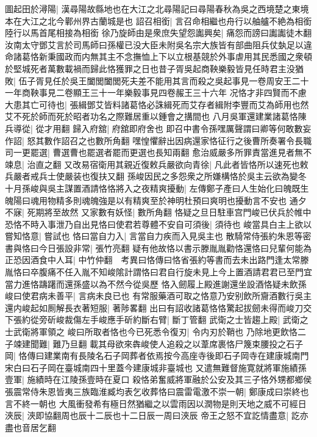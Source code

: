圖起田於潯陽|{
	漢尋陽故縣地也在大江之北尋陽記曰尋陽春秋為吳之西境楚之東境本在大江之北今鄿州界古蘭城是也}
詔召相銜|{
	言召命相繼也舟行以舳艫不絶為相銜陸行以馬首尾相接為相銜}
徐乃旋師由是衆庶失望怨讟興矣|{
	痛怨而謗曰讟讟徒木翻}
汝南太守鄧艾言於司馬師曰孫權已没大臣未附吳名宗大族皆有部曲阻兵仗埶足以違命諸葛恪新秉國政而内無其主不念撫恤上下以立根基競於外事虐用其民悉國之衆頓於堅城死者萬數載禍而歸此恪獲罪之日也昔子胥吳起商鞅樂毅皆見任時君主没猶敗|{
	伍子胥見任於吳王闔閭闔閭死夫差不能用其言而殺之吳起事見一卷周安王二十一年商鞅事見二卷顯王三十一年樂毅事見四卷赧王三十六年}
况恪才非四賢而不慮大患其亡可待也|{
	張緝鄧艾皆料諸葛恪必誅緝死而艾存者緝附李豐而艾為師用也然艾不死於師而死於昭者功名之際難居重以鍾會之搆間也}
八月吳軍還建業諸葛恪陳兵導從|{
	從才用翻}
歸入府舘|{
	府舘即府舍也}
即召中書令孫嘿厲聲謂曰卿等何敢數妄作詔|{
	怒其數作詔召之也數所角翻}
嘿惶懼辭出因病還家恪征行之後曹所奏署令長職司一更罷選|{
	曹選曹也罷選者罷而更選也長知兩翻}
愈治威嚴多所罪責當進見者無不竦息|{
	治直之翻}
又改易宿衛用其親近復敕兵嚴欲向青徐|{
	凡此者皆恪所以速死也敕兵嚴者戒兵士使嚴装也復扶又翻}
孫峻因民之多怨衆之所嫌構恪於吳主云欲為變冬十月孫峻與吳主謀置酒請恪恪將入之夜精爽擾動|{
	左傳鄭子產曰人生始化曰魄既生魄陽曰魂用物精多則魂魄強是以有精爽至於神明杜預曰爽明也擾動言不安也}
通夕不寐|{
	死期將至故然}
又家數有妖怪|{
	數所角翻}
恪疑之旦日駐車宫門峻已伏兵於帷中恐恪不時入事泄乃自出見恪曰使君若尊體不安自可須後|{
	須待也}
峻當具白主上欲以嘗知恪意|{
	嘗試也}
恪曰當自力入|{
	言當自力疾而入見吳主也}
散騎常侍張約朱恩等密書與恪曰今日張設非常|{
	張竹亮翻}
疑有他故恪以書示滕胤胤勸恪還恪曰兒輩何能為正恐因酒食中人耳|{
	中竹仲翻　考異曰恪傳曰恪省張約等書而去未出路門逢太常滕胤恪曰卒腹痛不任入胤不知峻隂計謂恪曰君自行旋未見上今上置酒請君君已至門宜當力進恪躊躇而還孫盛以為不然今從吳歷}
恪入劒履上殿進謝還坐設酒恪疑未飲孫峻曰使君病未善平|{
	言病未良已也}
有常服藥酒可取之恪意乃安别飲所齎酒數行吳主還内峻起如厠解長衣著短服|{
	著陟畧翻}
出曰有詔收諸葛恪恪驚起拔劒未得而峻刀交下張約從旁斫峻裁傷左手峻應手斫約斷右臂|{
	斷丁管翻}
武衛之士皆趨上殿|{
	武衛之士武衛將軍領之}
峻曰所取者恪也今已死悉令復刃|{
	令内刃於鞘也}
乃除地更飲恪二子竦建聞難|{
	難乃旦翻}
載其母欲來犇峻使人追殺之以葦席裹恪尸篾束腰投之石子岡|{
	恪傳曰建業南有長陵名石子岡葬者依焉按今高座寺後即石子岡寺在建康城南門宋白曰石子岡在臺城南四十里蓋今建康城非臺城也}
又遣無難督施寛就將軍施績孫壹軍|{
	施績時在江陵孫壹時在夏口}
殺恪弟奮威將軍融於公安及其三子恪外甥都鄉侯張震常侍朱恩皆夷三族臨淮臧均表乞收葬恪曰震雷電激不崇一朝|{
	鄭康成曰崇終也言不終一朝也}
大風衝發希有極日然猶繼之以雲雨因以潤物是則天地之威不可經日浹辰|{
	浹即協翻周也辰十二辰也十二日辰一周曰浹辰}
帝王之怒不宜訖情盡意|{
	訖亦盡也音居乞翻}
